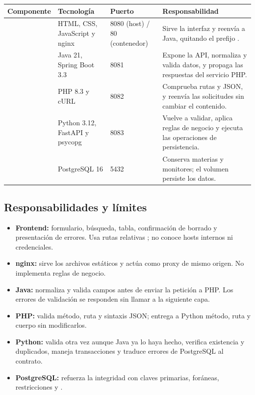 \begin{tabularx}{\textwidth}{p{}p{}p{}Y}
\toprule
\textbf{Componente} & \textbf{Tecnología} & \textbf{Puerto} & \textbf{Responsabilidad} \\
\midrule
{} & HTML, CSS, JavaScript y nginx & 8080 (host) / 80 (contenedor) & Sirve la interfaz y reenvía  a Java, quitando el prefijo . \\
 & Java 21, Spring Boot 3.3 & 8081 & Expone la API, normaliza y valida datos, y propaga las respuestas del servicio PHP. \\
 & PHP 8.3 y cURL & 8082 & Comprueba rutas y JSON, y reenvía las solicitudes sin cambiar el contenido. \\
 & Python 3.12, FastAPI y psycopg & 8083 & Vuelve a validar, aplica reglas de negocio y ejecuta las operaciones de persistencia. \\
 & PostgreSQL 16 & 5432 & Conserva materias y monitores; el volumen  persiste los datos. \\
\bottomrule
\end{tabularx}

\subsection{Responsabilidades y límites}

\begin{itemize}
  \item \textbf{Frontend:} formulario, búsqueda, tabla, confirmación de borrado y presentación de errores. Usa rutas relativas ; no conoce hosts internos ni credenciales.
  \item \textbf{nginx:} sirve los archivos estáticos y actúa como proxy de mismo origen. No implementa reglas de negocio.
  \item \textbf{Java:} normaliza y valida campos antes de enviar la petición a PHP. Los errores de validación se responden sin llamar a la siguiente capa.
  \item \textbf{PHP:} valida método, ruta y sintaxis JSON; entrega a Python método, ruta y cuerpo sin modificarlos.
  \item \textbf{Python:} valida otra vez aunque Java ya lo haya hecho, verifica existencia y duplicados, maneja transacciones y traduce errores de PostgreSQL al contrato.
  \item \textbf{PostgreSQL:} refuerza la integridad con claves primarias, foráneas, restricciones  y .
\end{itemize}

